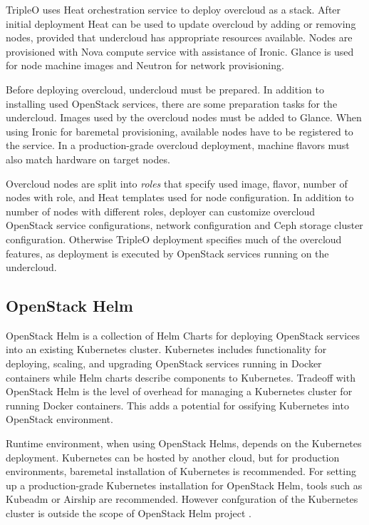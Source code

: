 \documentclass[officiallayout]{tktla}
\begin{document}
TripleO uses Heat orchestration service to deploy overcloud as a stack. After
initial deployment Heat can be used to update overcloud by adding or removing
nodes, provided that undercloud has appropriate resources available. Nodes are
provisioned with Nova compute service with assistance of Ironic. Glance is used
for node machine images and Neutron for network provisioning.

Before deploying overcloud, undercloud must be prepared. In addition to
installing used OpenStack services, there are some preparation tasks for the
undercloud. Images used by the overcloud nodes must be added to Glance. When
using Ironic for baremetal provisioning, available nodes have to be registered
to the service. In a production-grade overcloud deployment, machine flavors
must also match hardware on target nodes.

Overcloud nodes are split into \textit{roles} that specify used image, flavor,
number of nodes with role, and Heat templates used for node configuration. In
addition to number of nodes with different roles, deployer can customize
overcloud OpenStack service configurations, network configuration and Ceph
storage cluster configuration. Otherwise TripleO deployment specifies much of
the overcloud features, as deployment is executed by OpenStack services running
on the undercloud.

\subsection{OpenStack Helm}

OpenStack Helm \cite{openstack-helm} is a collection of Helm Charts for
deploying OpenStack services into an existing Kubernetes cluster. Kubernetes
includes functionality for deploying, scaling, and upgrading OpenStack services
running in Docker containers while Helm charts describe components to
Kubernetes. Tradeoff with OpenStack Helm is the level of overhead for managing
a Kubernetes cluster for running Docker containers. This adds a potential for
ossifying Kubernetes into OpenStack environment.

Runtime environment, when using OpenStack Helms, depends on the Kubernetes
deployment. Kubernetes can be hosted by another cloud, but for production
environments, baremetal installation of Kubernetes is recommended. For setting
up a production-grade Kubernetes installation for OpenStack Helm, tools such as
Kubeadm or Airship \cite{airship} are recommended. However confguration of the
Kubernetes cluster is outside the scope of OpenStack Helm project
\cite{openstack-helm}.
\end{document}
